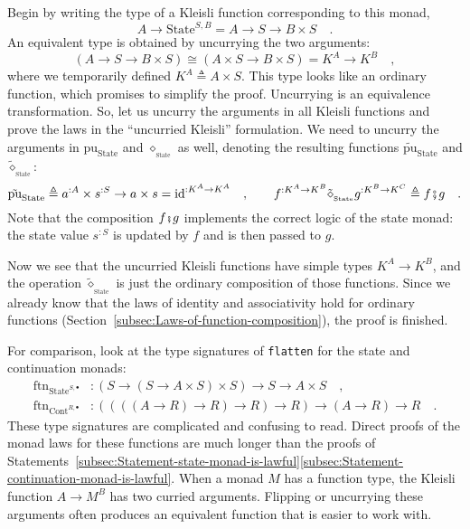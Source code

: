 Begin by writing the type of a Kleisli function corresponding to this
monad,
\[
A\rightarrow\text{State}^{S,B}=A\rightarrow S\rightarrow B\times S\quad.
\]
An equivalent type is obtained by uncurrying the two arguments:
\[
\left(A\rightarrow S\rightarrow B\times S\right)\cong\left(A\times S\rightarrow B\times S\right)=K^{A}\rightarrow K^{B}\quad,
\]
where we temporarily defined $K^{A}\triangleq A\times S$. This type
looks like an ordinary function, which promises to simplify the proof.
Uncurrying is an equivalence transformation. So, let us uncurry the
arguments in all Kleisli functions and prove the laws in the \textsf{``}uncurried
Kleisli\textsf{''} formulation. We need to uncurry the arguments in $\text{pu}_{\text{State}}$
and $\diamond_{_{\text{State}}}$ as well, denoting the resulting
functions $\tilde{\text{pu}}_{\text{State}}$ and $\tilde{\diamond}_{_{\text{State}}}$:
\[
\tilde{\text{pu}}_{\text{State}}\triangleq a^{:A}\times s^{:S}\rightarrow a\times s=\text{id}^{:K^{A}\rightarrow K^{A}}\quad,\quad\quad f^{:K^{A}\rightarrow K^{B}}\tilde{\diamond}_{_{\text{State}}}g^{:K^{B}\rightarrow K^{C}}\triangleq f\bef g\quad.
\]
Note that the composition $f\bef g$ implements the correct logic
of the state monad: the state value $s^{:S}$ is updated by $f$ and
is then passed to $g$.

Now we see that the uncurried Kleisli functions have simple types
$K^{A}\rightarrow K^{B}$, and the operation $\tilde{\diamond}_{_{\text{State}}}$
is just the ordinary composition of those functions. Since we already
know that the laws of identity and associativity hold for ordinary
functions (Section~\ref{subsec:Laws-of-function-composition}), the
proof is finished.

For comparison, look at the type signatures of \lstinline!flatten!
for the state and continuation monads:
\begin{align*}
\text{ftn}_{\text{State}^{S,\bullet}} & :\left(S\rightarrow\left(S\rightarrow A\times S\right)\times S\right)\rightarrow S\rightarrow A\times S\quad,\\
\text{ftn}_{\text{Cont}^{R,\bullet}} & :\left(\left(\left(\left(A\rightarrow R\right)\rightarrow R\right)\rightarrow R\right)\rightarrow R\right)\rightarrow\left(A\rightarrow R\right)\rightarrow R\quad.
\end{align*}
These type signatures are complicated and confusing to read. Direct
proofs of the monad laws for these functions are much longer than
the proofs of Statements~\ref{subsec:Statement-state-monad-is-lawful}\textendash \ref{subsec:Statement-continuation-monad-is-lawful}.
When a monad $M$ has a function type, the Kleisli function $A\rightarrow M^{B}$
has two curried arguments. Flipping or uncurrying these arguments
often produces an equivalent function that is easier to work with. 

